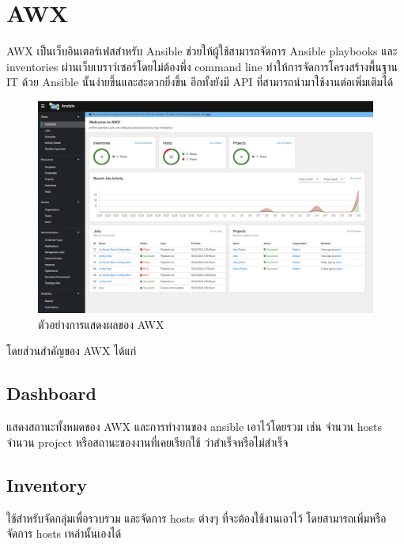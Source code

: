 \section{AWX}
\hspace{0.5in} AWX เป็นเว็บอินเตอร์เฟสสำหรับ Ansible ช่วยให้ผู้ใช้สามารถจัดการ Ansible playbooks และ inventories ผ่านเว็บเบราว์เซอร์โดยไม่ต้องพึ่ง command line ทำให้การจัดการโครงสร้างพื้นฐาน IT ด้วย Ansible นั้นง่ายขึ้นและสะดวกยิ่งขึ้น อีกทั้งยังมี API ที่สามารถนำมาใช้งานต่อเพิ่มเติมได้

\begin{figure}[h]
  \begin{center}
    \includegraphics[scale=0.55]{awx.png}
  \end{center}
  \caption[Poem]{ตัวอย่างการแสดงผลของ AWX}
  \label{fig:ansible_playbook}
\end{figure}

\hspace{0.3in} โดยส่วนสำคัญของ AWX ได้แก่


\subsection{Dashboard}
\hspace{0.5in} แสดงสถานะทั้งหมดของ AWX และการทำงานของ ansible เอาไว้โดยรวม เช่น จำนวน hosts จำนวน project หรือสถานะของงานที่เคยเรียกใช้ ว่าสำเร็จหรือไม่สำเร็จ

\subsection{Inventory}
\hspace{0.5in} ใช้สำหรับจัดกลุ่มเพื่อรวบรวม และจัดการ hosts ต่างๆ ที่จะต้องใช้งานเอาไว้ โดยสามารถเพิ่มหรือจัดการ hosts เหล่านั้นเองได้

